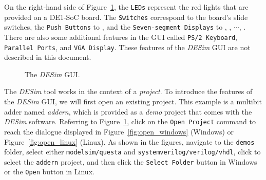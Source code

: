On the right-hand side of Figure~\ref{fig:gui}, the \texttt{LEDs} represent the 
red lights  that are provided on a DE1-SoC board. The
\texttt{Switches} correspond to the board's  slide switches, the 
\texttt{Push Buttons} to , and the \texttt{Seven-segment
Displays} to , , $\cdots$, .
There are also some additional features in the GUI called \texttt{PS/2 Keyboard}, 
\texttt{Parallel Ports}, and \texttt{VGA Display}. These features of
the {\it DESim} GUI are not described in this document. 

\begin{figure}[h]
	\begin{center}
        \setlength{\fboxsep}{0pt}
	\end{center}
		  \caption{The {\it DESim} GUI.}
	\label{fig:gui}
\end{figure}

The {\it DESim} tool works in the context of a {\it project}. To introduce the features of the 
{\it DESim} GUI, we will first open an existing project. This example is a multibit adder 
named {\it addern}, which is provided as a {\it demo} project that comes with the {\it DESim}
software. Referring to Figure~\ref{fig:gui}, click on the \texttt{Open Project} command 
to reach the dialogue displayed in Figure~\ref{fig:open_windows} (Windows) or 
Figure~\ref{fig:open_linux} (Linux). As shown in the figures, navigate
to the \texttt{demos} folder, select either \texttt{modelsim/questa} and 
\texttt{systemverilog/verilog/vhdl}, click to select the \texttt{addern} project, and then 
click the \texttt{Select Folder} button in Windows or the \texttt{Open} button in Linux.

